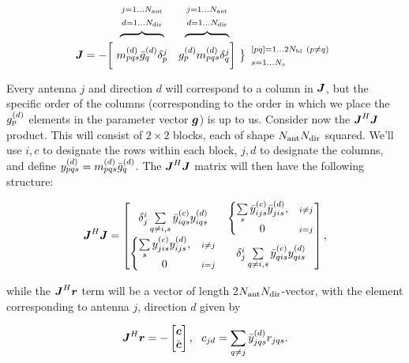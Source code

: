 \documentclass[useAMS,usenatbib]{mn2e}
\newcommand{\mat}[1]{{\bmath{#1}}}
\newcommand{\JJ}{\mat{J}} %
\newcommand{\JHJ}{\JJ^H\JJ} %
\begin{document}
\[
\begin{array}{r@{~}cc@{~}cc}
 & \overbrace{~~~~~~~~~~~~}^{\Stack{\scriptstyle j=1\dots \Na\\\scriptstyle d=1\dots \Nd}} & 
   \overbrace{~~~~~~~~~~~~}^{\Stack{\scriptstyle j=1\dots \Na\\\scriptstyle d=1\dots \Nd}} \\
\JJ = - \bigg [ &
  \mmd_{pqs}\ggdH_q \delta^j_p & 
  \ggd_p \mmd_{pqs}  \delta^j_q 
\bigg ] &
\big \}
\begin{array}{l}
\scriptstyle [pq]=1\dots 2\Nbl~(p\ne q)\\ \scriptstyle s=1\dots\Ns
\end{array}

\end{array}
\]

Every antenna $j$ and direction $d$ will correspond to a column in $\JJ$, but the specific order of the columns 
(corresponding to the order in which we place the $g^{(d)}_p$ elements in the parameter vector $\bmath{g}$)
is up to us. Consider now the $\JHJ$ product. This will consist of $2\times2$ blocks, each of shape 
$N_\mathrm{ant}N_\mathrm{dir}$ squared. We'll use $i,c$ to designate the rows within each block, $j,d$ to designate the columns, 
and define $y^{(d)}_{pqs}=m^{(d)}_{pqs}\bar{g}^{(d)}_q$. The $\JHJ$ matrix will then have the following structure:

\begin{equation}
\JHJ = \Matrix{cc}{
  \delta^i_j \sum\limits_{q\ne i,s} \yycH_{iqs} \yyd_{iqs}  & 
  \left \{ 
  \begin{array}{@{}cc@{}}
   \sum\limits_{s} \yycH_{ijs} \yydH_{jis}, & {\scriptstyle i\ne j}\\
   0 &{\scriptstyle i=j}
  \end{array} \right . 
  \\
  \left \{ 
  \begin{array}{@{}cc@{}}
   \sum\limits_{s} \yyc_{jis} \yyd_{ijs},&{\scriptstyle i\ne j} \\
   0 &{\scriptstyle i=j}
  \end{array} \right . 
  &
  \delta^i_j \sum\limits_{q\ne i,s} \yycH_{qis}\yyd_{qis}
},
\label{eq:JHJ:DD:unpol}
\end{equation}

while the $\JJ^H\bmath{r}$ term will be a vector of length 2$N_\mathrm{ant}N_\mathrm{dir}$-vector, with the element corresponding to 
antenna $j$, direction $d$ given by 

\[
\JJ^H\bmath{r} = -\Matrix{c}{\bmath{c}\\\bar{\bmath{c}}},~~c_{jd} = \sum\limits_{q\ne j} \yydH_{jqs} r_{jqs}.
\]
\end{document}
